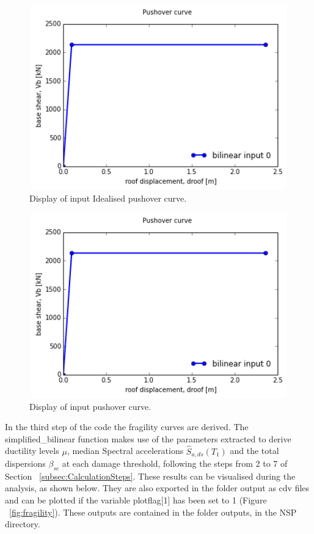 \begin{figure}[H]
\centering
\includegraphics[width=12cm,height=8cm]{./figures/IdealisedCurve.png}
\caption{Display of input Idealised pushover curve.}
\label{fig:expIdealised}
\end{figure}

\begin{figure}[H]
\centering
\includegraphics[width=12cm,height=8cm]{./figures/IdealisedCurve.png}
\caption{Display of input pushover curve.}
\label{fig:expPushover}
\end{figure}

In the third step of the code the fragility curves are derived. The simplified\_bilinear function makes use of the parameters extracted to derive ductility levels $\mu$, median Spectral accelerations $\hat{S}_{a,ds}(T_1)$ and the total dispersions $\beta_{sc}$ at each damage threshold, following the steps from 2 to 7 of Section ~\ref{subsec:CalculationSteps}. These results can be visualised during the analysis, as shown below. They are also exported in the folder output as cdv files and can be plotted if the variable plotflag[1] has been set to 1 (Figure ~\ref{fig:fragility}). These outputs are contained in the folder outputs, in the NSP directory.

